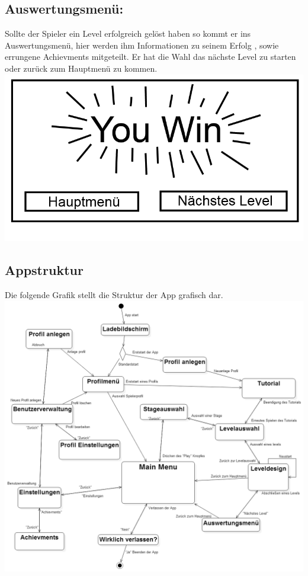 \documentclass{scrartcl}
\begin{document}
\begin{enumerate}
	\begin{minipage}{1\textwidth}
		\item \subsection*{Auswertungsmenü:}
		Sollte der Spieler ein Level erfolgreich gelöst haben so kommt er ins Auswertungsmenü, hier werden ihm Informationen zu seinem Erfolg , sowie errungene Achievments mitgeteilt. Er hat die Wahl das nächste Level zu starten oder zurück zum Hauptmenü zu kommen. 
		\includegraphics[width=\textwidth]{assets/Auswertungsmenu}
	\end{minipage}

\end{enumerate}

\clearpage

\begin{minipage}{1\textwidth}
\subsection{Appstruktur}
	Die folgende Grafik stellt die Struktur der App grafisch dar.\\
	\includegraphics[width=\textwidth]{assets/Menustructur}
\end{minipage}
\end{document}
